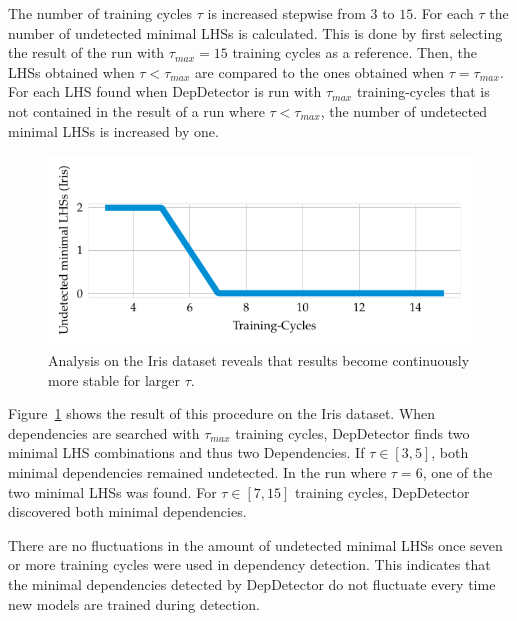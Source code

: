 The number of training cycles \( \tau \) is increased stepwise from \( 3 \text{ to } 15 \).
For each \( \tau \) the number of undetected minimal LHSs is calculated.
This is done by first selecting the result of the run with \( \tau_{max} = 15 \) training cycles as a reference.
Then, the LHSs obtained when \( \tau < \tau_{max} \) are compared to the ones obtained when \( \tau = \tau_{max} \).
For each LHS found when DepDetector is run with \( \tau_{max} \) training-cycles that is not contained in the result of a run where \( \tau < \tau_{max} \), the number of undetected minimal LHSs is increased by one.

\begin{figure}[ht]
     \centering
     \includegraphics[width=\textwidth]{../figures/iris/dep_detector_lhs_stability}
     \caption{Analysis on the Iris dataset reveals that results become continuously more stable for larger \( \tau \).}
     \label{fig:dep_detector_lhs_stability_iris}
\end{figure}

Figure~\ref{fig:dep_detector_lhs_stability_iris} shows the result of this procedure on the Iris dataset.
When dependencies are searched with \( \tau_{max} \) training cycles, DepDetector finds two minimal LHS combinations and thus two Dependencies.
If \( \tau \in [3, 5] \), both minimal dependencies remained undetected.
In the run where \( \tau = 6 \), one of the two minimal LHSs was found.
For \( \tau \in [7, 15] \) training cycles, DepDetector discovered both minimal dependencies.

There are no fluctuations in the amount of undetected minimal LHSs once seven or more training cycles were used in dependency detection.
This indicates that the minimal dependencies detected by DepDetector do not fluctuate every time new models are trained during detection.

